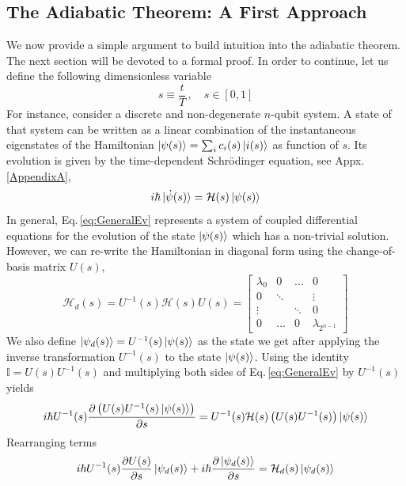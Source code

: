 \subsection{The Adiabatic Theorem: A First Approach}
We now provide a simple argument to build intuition into the adiabatic theorem. The next section will be devoted to a formal proof. In order to continue, let us define the following dimensionless variable
\begin{equation}
    s \equiv \frac{t}{T}\, , \quad s \in [0,1]
\end{equation}
For instance, consider a discrete and non-degenerate $n$-qubit system. A state of that system can be written as a linear combination of the instantaneous eigenstates of the Hamiltonian $\ket{\psi(s)} = \sum_{i}c_{i}(s)\ket{i(s)}$ as function of $s$. Its evolution is given by the time-dependent Schrödinger equation, see Appx.\,\ref{AppendixA},
\begin{equation}
\label{eq:GeneralEv}
    i\hbar \ket{\dot{\psi}(s)} = \mathcal{H}(s) \ket{\psi(s)}
\end{equation}
In general, Eq.\,\eqref{eq:GeneralEv} represents a system of coupled differential equations for the evolution of the state $\ket{\psi(s)}$ which has a non-trivial solution. However, we can re-write the Hamiltonian in diagonal form using the change-of-basis matrix $U(s)$,
\begin{equation}
    \mathcal{H}_{d}(s) = U^{-1}(s)\mathcal{H}(s)U(s) = \begin{bmatrix}
           \lambda_{0} & 0 & \hdots & 0 \\
           0 &  \ddots & & \vdots \\
           \vdots &   & \ddots & 0 \\
           0 & \hdots & 0 & \lambda_{2^{n-1}}
         \end{bmatrix}
\end{equation}
We also define $\ket{\psi_{d}(s)} = U^{-1}(s)\ket{\psi(s)}$ as the state we get after applying the inverse transformation $U^{-1}(s)$ to the state $\ket{\psi(s)}$. Using the identity $\mathbb{I} = U(s)U^{-1}(s)$ and multiplying both sides of Eq.\,\eqref{eq:GeneralEv} by $U^{-1}(s)$ yields
\begin{equation}
     i\hbar U^{-1}(s) \frac{\partial \left(U(s)U^{-1}(s)\ket{\psi(s)}\right)}{\partial s} = U^{-1}(s)\mathcal{H}(s) \left(U(s)U^{-1}(s)\right)\ket{\psi(s)}
\end{equation}
Rearranging terms
\begin{equation}
     i\hbar U^{-1}(s) \frac{\partial U(s)}{\partial s}\ket{\psi_{d}(s)} + i\hbar  \frac{\partial \ket{\psi_{d}(s)}}{\partial s}= \mathcal{H}_{d}(s)\ket{\psi_{d}(s)}
\end{equation}
